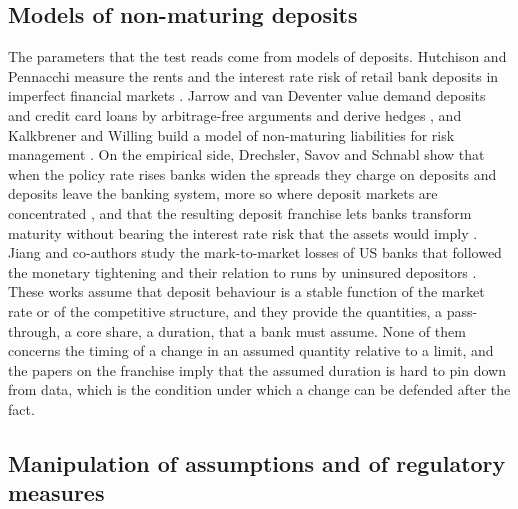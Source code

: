 \subsection{Models of non-maturing deposits}
\label{sec:rw-deposits}

The parameters that the test reads come from models of deposits. Hutchison and Pennacchi measure the rents and the interest rate risk of retail bank deposits in imperfect financial markets \citep{hutchison1996}. Jarrow and van Deventer value demand deposits and credit card loans by arbitrage-free arguments and derive hedges \citep{jarrow1998}, and Kalkbrener and Willing build a model of non-maturing liabilities for risk management \citep{kalkbrener2004}. On the empirical side, Drechsler, Savov and Schnabl show that when the policy rate rises banks widen the spreads they charge on deposits and deposits leave the banking system, more so where deposit markets are concentrated \citep{drechsler2017}, and that the resulting deposit franchise lets banks transform maturity without bearing the interest rate risk that the assets would imply \citep{drechsler2021}. Jiang and co-authors study the mark-to-market losses of US banks that followed the monetary tightening and their relation to runs by uninsured depositors \citep{jiang2024}. These works assume that deposit behaviour is a stable function of the market rate or of the competitive structure, and they provide the quantities, a pass-through, a core share, a duration, that a bank must assume. None of them concerns the timing of a change in an assumed quantity relative to a limit, and the papers on the franchise imply that the assumed duration is hard to pin down from data, which is the condition under which a change can be defended after the fact.

\subsection{Manipulation of assumptions and of regulatory measures}
\label{sec:rw-manipulation}

